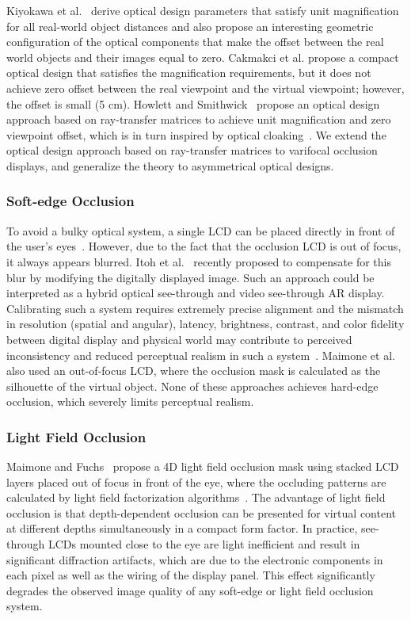 Kiyokawa et al.~\cite{Kiyokawa2003} derive optical design parameters that satisfy unit magnification for all real-world object distances and also propose an interesting geometric configuration of the optical components that make the offset between the real world objects and their images equal to zero.
Cakmakci et al. \cite{Cakmakci2004} propose a compact optical design that satisfies the magnification requirements, but it does not achieve zero offset between the real viewpoint and the virtual viewpoint; however, the offset is small (5 cm). 
Howlett and Smithwick~\cite{Howlett2017} propose an optical design approach based on ray-transfer matrices to achieve unit magnification and zero viewpoint offset, which is in turn inspired by optical cloaking~\cite{Choi2015}.
We extend the optical design approach based on ray-transfer matrices to varifocal occlusion displays, and generalize the theory to asymmetrical optical designs.  

\subsubsection{Soft-edge Occlusion} 

To avoid a bulky optical system, a single LCD can be placed directly in front of the user's eyes~\cite{Wetzstein2010,Itoh2017}. However, due to the fact that the occlusion LCD is out of focus, it always appears blurred. Itoh et al.~\cite{Itoh2017} recently proposed to compensate for this blur by modifying the digitally displayed image.
Such an approach could be interpreted as a hybrid optical see-through and video see-through AR display. 
Calibrating such a system requires extremely precise alignment and the mismatch in resolution (spatial and angular), latency, brightness, contrast, and color fidelity between digital display and physical world may contribute to perceived inconsistency and reduced perceptual realism in such a system~\cite{Rolland2000}. 
Maimone et al.~\cite{Maimone2014Pinlight} also used an out-of-focus LCD, where the occlusion mask is calculated as the silhouette of the virtual object. None of these approaches achieves hard-edge occlusion, which severely limits perceptual realism.

\subsubsection{Light Field Occlusion}
Maimone and Fuchs~\cite{maimone2013general} propose a 4D light field occlusion mask using stacked LCD layers placed out of focus in front of the eye, where the occluding patterns are calculated by light field factorization algorithms~\cite{Lanman2010, Wetzstein2012}. 
The advantage of light field occlusion is that depth-dependent occlusion can be presented for virtual content at different depths simultaneously in a compact form factor. 
In practice, see-through LCDs mounted close to the eye are light inefficient and result in significant diffraction artifacts, which are due to the electronic components in each pixel as well as the wiring of the display panel. This effect significantly degrades the observed image quality of any soft-edge or light field occlusion system. 

